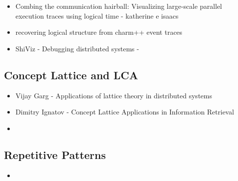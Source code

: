 \begin{itemize}
\item Combing the communication hairball: Visualizing large-scale parallel execution traces using logical time - katherine e isaacs \cite{ravel}
\item recovering logical structure from charm++ event traces \cite{charmVis}
\item ShiViz - Debugging distributed systems - \cite{shiviz}
\end{itemize}



\subsection{Concept Lattice and LCA}


\begin{itemize}
\item Vijay Garg - Applications of lattice theory in distributed systems

\item Dimitry Ignatov \cite{ignatov} - Concept Lattice Applications in Information Retrieval

\item \cite{clbook} \cite{clconst} \cite{bender05} \citep{latticeForDistConst} \cite{diff-myers}
\end{itemize}

\subsection{Repetitive Patterns}


\begin{itemize}
\item \cite{kmruse} \cite{kmr} \cite{nakamura_fast_2013} \cite{crochemore_jewels_2002} \citep{Crochemore:1994:TA:199269}
\end{itemize}


